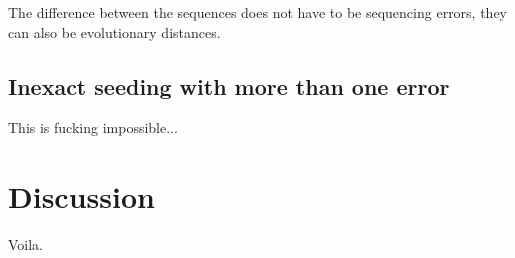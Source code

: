 \documentclass{article}
\begin{document}
The difference between the sequences does not have to be sequencing
errors, they can also be evolutionary distances.

\subsection{Inexact seeding with more than one error}

This is fucking impossible...






\section{Discussion}

Voila.






\end{document}
